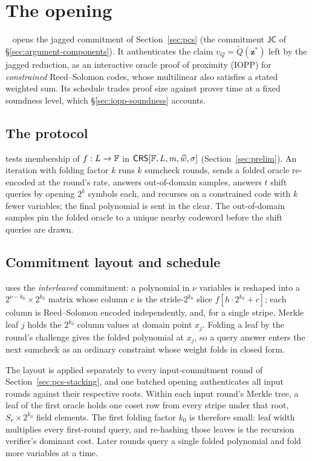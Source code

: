 \section{The \WHIR{} opening}
\label{sec:iopp}

\WHIR{}~\citep{whir} opens the jagged commitment of Section~\ref{sec:pcs} (the commitment $\mathsf{JC}$ of \S\ref{sec:argument-components}). It authenticates the claim $v_Q = \widetilde Q(\bm z^{*})$ left by the jagged reduction, as an interactive oracle proof of proximity (IOPP) for \emph{constrained} Reed--Solomon codes, whose multilinear also satisfies a stated weighted sum. Its schedule trades proof size against prover time at a fixed soundness level, which \S\ref{sec:iopp-soundness} accounts.

\subsection{The protocol}
\label{sec:iopp-protocol}

\WHIR{} tests membership of $f : L \to \mathbb{F}$ in $\mathsf{CRS}[\mathbb{F}, L, m, \widehat w, \sigma]$ (Section~\ref{sec:prelim}). An iteration with folding factor $k$ runs $k$ sumcheck rounds, sends a folded oracle re-encoded at the round's rate, answers out-of-domain samples, answers $t$ shift queries by opening $2^k$ symbols each, and recurses on a constrained code with $k$ fewer variables; the final polynomial is sent in the clear. The out-of-domain samples pin the folded oracle to a unique nearby codeword before the shift queries are drawn.

\subsection{Commitment layout and schedule}
\label{sec:iopp-commit}

\Ziren{} uses the \emph{interleaved} commitment: a polynomial in $\nu$ variables is reshaped into a $2^{\nu-k_0} \times 2^{k_0}$ matrix whose column $c$ is the stride-$2^{k_0}$ slice $f[h \cdot 2^{k_0} + c]$; each column is Reed--Solomon encoded independently, and, for a single stripe, Merkle leaf $j$ holds the $2^{k_0}$ column values at domain point $x_j$. Folding a leaf by the round's challenge gives the folded polynomial at $x_j$, so a query answer enters the next sumcheck as an ordinary constraint whose weight folds in closed form.

The layout is applied separately to every input-commitment round of Section~\ref{sec:pcs-stacking}, and one batched \WHIR{} opening authenticates all input rounds against their respective roots. Within each input round's Merkle tree, a leaf of the first oracle holds one coset row from every stripe under that root, $S_r \times 2^{k_0}$ field elements. The first folding factor $k_0$ is therefore small: leaf width multiplies every first-round query, and re-hashing those leaves is the recursion verifier's dominant cost. Later rounds query a single folded polynomial and fold more variables at a time.

